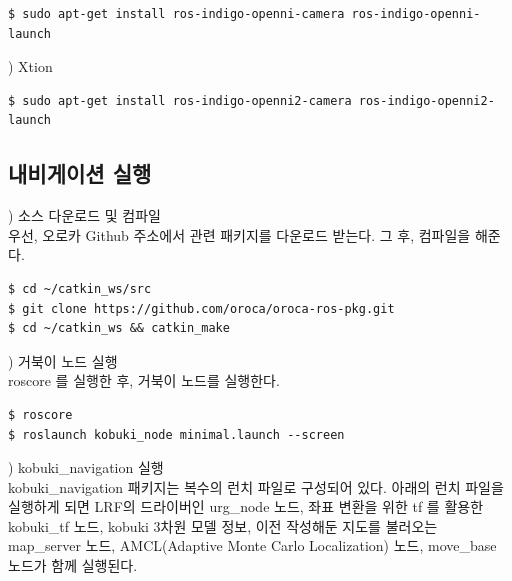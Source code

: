 \vspace{\baselineskip}
\begin{lstlisting}[language=ROS]
$ sudo apt-get install ros-indigo-openni-camera ros-indigo-openni-launch
\end{lstlisting}


\vspace{\baselineskip}
\noindent
{}
\thenum) Xtion

\vspace{\baselineskip}
\begin{lstlisting}[language=ROS]
$ sudo apt-get install ros-indigo-openni2-camera ros-indigo-openni2-launch
\end{lstlisting}


\subsection{내비게이션 실행}

\setcounter{num}{0}

\vspace{\baselineskip}
\noindent
{}
\thenum) 소스 다운로드 및 컴파일\\
우선, 오로카 Github 주소에서 관련 패키지를 다운로드 받는다. 그 후, 컴파일을 해준다.

\vspace{\baselineskip}
\begin{lstlisting}[language=ROS]
$ cd ~/catkin_ws/src
$ git clone https://github.com/oroca/oroca-ros-pkg.git
$ cd ~/catkin_ws && catkin_make
\end{lstlisting}

\vspace{\baselineskip}
\noindent
{}
\thenum) 거북이 노드 실행\\
roscore 를 실행한 후, 거북이 노드를 실행한다.

\vspace{\baselineskip}
\begin{lstlisting}[language=ROS]
$ roscore
$ roslaunch kobuki_node minimal.launch --screen
\end{lstlisting}

\vspace{\baselineskip}
\noindent
{}
\thenum) kobuki\_navigation 실행\\
kobuki\_navigation 패키지는 복수의 런치 파일로 구성되어 있다. 아래의 런치 파일을 실행하게 되면 LRF의 드라이버인 urg\_node 노드, 좌표 변환을 위한 tf 를 활용한 kobuki\_tf 노드, kobuki 3차원 모델 정보, 이전 작성해둔 지도를 불러오는 map\_server 노드, AMCL(Adaptive Monte Carlo Localization) 노드, move\_base 노드가 함께 실행된다.

